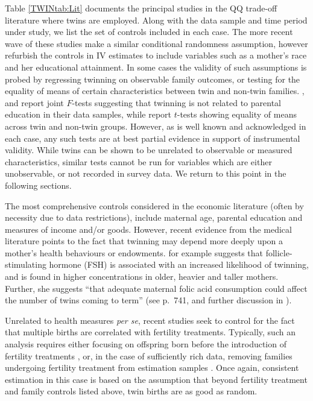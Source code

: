 Table \ref{TWINtab:Lit} documents the principal studies in the QQ trade-off 
literature where twins are employed.  Along with the data sample and time period 
under study, we list the set of controls included in each case.  The more recent
wave of these studies make a similar conditional randomness assumption, however
refurbish the controls in IV estimates to include variables such as a mother's 
race and her educational attainment.  In some cases the validity of such 
assumptions is probed by regressing twinning on observable family outcomes, or 
testing for the equality of means of certain characteristics between twin and
non-twin families. \citet{Blacketal2005}, \citet{Lietal2008} and 
\citet{Sanhueza2009} report joint $F$-tests suggesting that twinning is not 
related to parental education in their data samples, while 
\citet{RosenzweigZhang2009} report $t$-tests showing equality of means across 
twin and non-twin groups. However, as is well known and acknowledged in each 
case, any such tests are at best partial evidence in support of instrumental 
validity. While twins can be shown to be unrelated to observable or measured 
characteristics, similar tests cannot be run for variables which are either 
unobservable, or not recorded in survey data. We return to this point in the 
following sections.

The most comprehensive controls considered in the economic literature (often by
necessity due to data restrictions), include maternal age, parental education
and measures of income and/or goods.  However, recent evidence from the medical
literature points to the fact that twinning may depend more deeply upon a 
mother's health behaviours or endowments. \citet{Hall2003} for example suggests 
that follicle-stimulating hormone (FSH) is associated with an increased 
likelihood of twinning, and is found in higher concentrations in older, heavier 
and taller mothers. Further, she suggests ``that adequate maternal folic acid 
consumption could affect the number of twins coming to term'' (see p.\ 741, and 
further discussion in \citet{Lietal2003}).

Unrelated to health measures \emph{per se}, recent studies seek to control for 
the fact that multiple births are correlated with fertility treatments. 
Typically, such an analysis requires either focusing on offspring born before
the introduction of fertility treatments \citep{Caceres2006,Angristetal2010}, 
or, in the case of sufficiently rich data, removing families undergoing 
fertility treatment from estimation samples \citep{Braakman2014}. Once again, 
consistent estimation in this case is based on the assumption that beyond 
fertility treatment and family controls listed above, twin births are as good as 
random.

